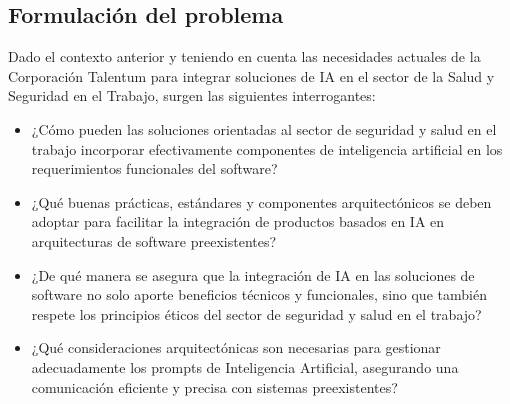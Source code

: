 \subsection{Formulación del problema}

Dado el contexto anterior y teniendo en cuenta las necesidades actuales de la Corporación Talentum para integrar soluciones de IA en el sector de la Salud y Seguridad en el Trabajo, surgen las siguientes interrogantes:
\begin{itemize}
    \item ¿Cómo pueden las soluciones orientadas al sector de seguridad y salud en el trabajo incorporar efectivamente componentes de inteligencia artificial en los requerimientos funcionales del software?
    \item ¿Qué buenas prácticas, estándares y componentes arquitectónicos se deben adoptar para facilitar la integración de productos basados en IA en arquitecturas de software preexistentes?
    \item ¿De qué manera se asegura que la integración de IA en las soluciones de software no solo aporte beneficios técnicos y funcionales, sino que también respete los principios éticos del sector de seguridad y salud en el trabajo?
    \item ¿Qué consideraciones arquitectónicas son necesarias para gestionar adecuadamente los prompts de Inteligencia Artificial, asegurando una comunicación eficiente y precisa con sistemas preexistentes?
\end{itemize}


